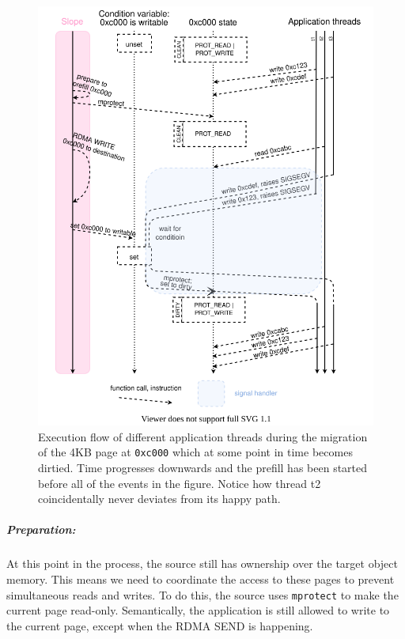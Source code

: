 \begin{figure}[t]
\centering

\includegraphics[width=1\textwidth]{dirty-detection.drawio}
\caption{
    Execution flow of different application threads during the migration of
    the 4KB page at \texttt{0xc000} which at some point in time becomes dirtied.
    Time progresses downwards and the prefill has been started before all of
    the events in the figure. Notice how thread t2 coincidentally never
    deviates from its happy path.
}
\label{fig:dirtydetection}
\end{figure}

\subparagraph{Preparation:} At this point in the process, the source still
has ownership over the target object memory. This means we need to coordinate
the access to these pages to prevent simultaneous reads and writes. To do this,
the source uses \texttt{mprotect} to make the current page read-only.
Semantically, the application is still allowed to write to the current page,
except when the RDMA SEND is happening.

